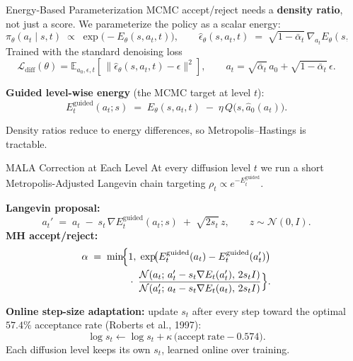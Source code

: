 \documentclass[final,hyperref={pdfpagelabels=false}]{beamer}
\newcommand{\E}{\mathbb{E}}
\newlength{\colwidth}
\begin{document}
\begin{frame}[t]
\begin{columns}[t]
\begin{column}{\colwidth}
\end{column}

\begin{column}{\colwidth}

\begin{block}{\Large Energy-Based Parameterization}
MCMC accept/reject needs a \textbf{density ratio}, not just a score. We parameterize the policy as a scalar energy:
\[
  \pi_\theta(a_t\mid s,t)\;\propto\;\exp\!\bigl(-E_\theta(s,a_t,t)\bigr),\qquad
  \hat\epsilon_\theta(s,a_t,t)\;=\;\sqrt{1-\bar\alpha_t}\,\nabla_{a_t}E_\theta(s,a_t,t).
\]
Trained with the standard denoising loss
\[
  \mathcal{L}_{\mathrm{diff}}(\theta)=\E_{a_0,\epsilon,t}\!\left[\,\bigl\lVert\hat\epsilon_\theta(s,a_t,t)-\epsilon\bigr\rVert^2\right],\qquad
  a_t=\sqrt{\bar\alpha_t}\,a_0+\sqrt{1-\bar\alpha_t}\,\epsilon.
\]

\vspace{0.3em}
\textbf{Guided level-wise energy} (the MCMC target at level $t$):
\[
  E_t^{\mathrm{guided}}(a_t;s)\;=\;E_\theta(s,a_t,t)\;-\;\eta\,Q\bigl(s,\hat a_0(a_t)\bigr).
\]

\vspace{0.3em}
Density ratios reduce to energy differences, so Metropolis--Hastings is tractable.
\end{block}

\vspace{0.5cm}

\begin{block}{\Large MALA Correction at Each Level}
At every diffusion level $t$ we run a short Metropolis-Adjusted Langevin chain targeting $\rho_t\propto e^{-E_t^{\mathrm{guided}}}$.

\vspace{0.4em}
\textbf{Langevin proposal:}
\[
  a_t' \;=\; a_t \;-\; s_t\,\nabla E_t^{\mathrm{guided}}(a_t;s) \;+\; \sqrt{2 s_t}\,z,\qquad z\sim\mathcal{N}(0,I).
\]
\textbf{MH accept/reject:}
\begin{align*}
  \alpha \;=\; \min\!\Bigl\{&1,\;
  \exp\!\bigl(E_t^{\mathrm{guided}}(a_t)-E_t^{\mathrm{guided}}(a_t')\bigr) \\
  &\cdot\;\frac{\mathcal{N}(a_t;\,a_t'-s_t\nabla E_t(a_t'),\,2 s_t I)}{\mathcal{N}(a_t';\,a_t-s_t\nabla E_t(a_t),\,2 s_t I)}\Bigr\}.
\end{align*}

\vspace{0.3em}
\textbf{Online step-size adaptation:} update $s_t$ after every step toward the optimal $57.4\%$ acceptance rate (Roberts et al., 1997):
\[
  \log s_t \leftarrow \log s_t + \kappa\,\bigl(\mathrm{accept\ rate}-0.574\bigr).
\]
Each diffusion level keeps its own $s_t$, learned online over training.
\end{block}


\end{column}
\end{columns}
\end{frame}
\end{document}

